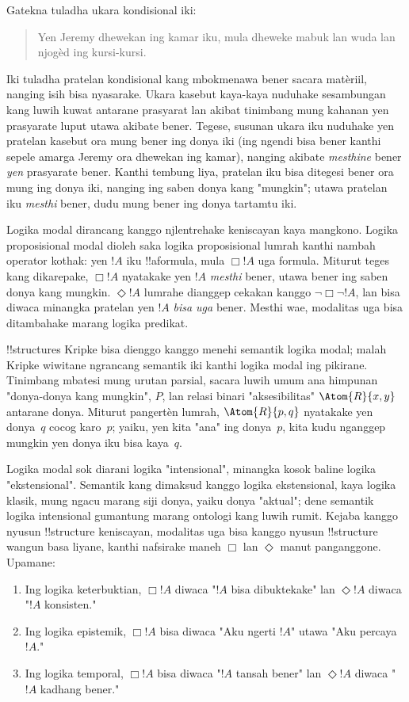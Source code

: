 \documentclass[../../../include/open-logic-section]{subfiles}
\begin{document}


Gatekna tuladha ukara kondisional iki:
\begin{quote}
  Yen Jeremy dhewekan ing kamar iku,
  mula dheweke mabuk lan wuda lan
  njogèd ing kursi-kursi.
\end{quote}
Iki tuladha pratelan kondisional kang
mbokmenawa bener sacara matèriil,
nanging isih bisa nyasarake.
Ukara kasebut kaya-kaya nuduhake
sesambungan kang luwih kuwat
antarane prasyarat lan akibat
tinimbang mung kahanan yen
prasyarate luput utawa akibate
bener. Tegese, susunan ukara
iku nuduhake yen pratelan
kasebut ora mung bener ing
donya iki (ing ngendi bisa
bener kanthi sepele amarga
Jeremy ora dhewekan ing kamar),
nanging akibate \emph{mesthine}
bener \emph{yen} prasyarate
bener. Kanthi tembung liya,
pratelan iku bisa ditegesi
bener ora mung ing donya iki,
nanging ing saben donya kang
"mungkin"; utawa pratelan
iku \emph{mesthi} bener,
dudu mung bener ing donya
tartamtu iki.

Logika modal dirancang kanggo
njlentrehake keniscayan kaya
mangkono. Logika proposisional
modal dioleh saka logika
proposisional lumrah kanthi
nambah operator kothak:
yen $!A$ iku !!a{formula},
mula $\Box !A$ uga
formula. Miturut
teges kang dikarepake,
$\Box !A$ nyatakake
yen $!A$ \emph{mesthi}
bener, utawa bener ing
saben donya kang mungkin.
$\Diamond !A$ lumrahe
dianggep cekakan kanggo
$\lnot \Box \lnot !A$,
lan bisa diwaca minangka
pratelan yen $!A$
\emph{bisa uga} bener.
Mesthi wae, modalitas
uga bisa ditambahake
marang logika predikat.

!!{structure}s Kripke bisa
dienggo kanggo menehi
semantik logika modal;
malah Kripke wiwitane
ngrancang semantik iki
kanthi logika modal
ing pikirane. Tinimbang
mbatesi mung urutan
parsial, sacara luwih
umum ana himpunan
"donya-donya kang mungkin",
$P$, lan relasi binari
"aksesibilitas"
$\Atom{R}{x,y}$
antarane donya.
Miturut pangertèn
lumrah, $\Atom{R}{p,q}$
nyatakake yen donya~$q$
cocog karo~$p$;
yaiku, yen kita "ana"
ing donya~$p$, kita
kudu nganggep mungkin
yen donya iku bisa
kaya~$q$.

Logika modal sok diarani
logika "intensional",
minangka kosok baline
logika "ekstensional".
Semantik kang dimaksud
kanggo logika ekstensional,
kaya logika klasik,
mung ngacu marang siji
donya, yaiku donya
"aktual"; dene semantik
logika intensional
gumantung marang ontologi
kang luwih rumit.
Kejaba kanggo nyusun
!!{structure} keniscayan,
modalitas uga bisa
kanggo nyusun
!!{structure} wangun
basa liyane, kanthi
nafsirake maneh
$\Box$ lan $\Diamond$
manut panganggone.
Upamane:
\begin{enumerate}
\item Ing logika keterbuktian,
  $\Box !A$ diwaca
  "$!A$ bisa dibuktekake"
  lan $\Diamond !A$ diwaca
  "$!A$ konsisten."
\item Ing logika epistemik,
  $\Box !A$ bisa diwaca
  "Aku ngerti $!A$"
  utawa "Aku percaya $!A$."
\item Ing logika temporal,
  $\Box !A$ bisa diwaca
  "$!A$ tansah bener"
  lan $\Diamond !A$ diwaca
  "$!A$ kadhang bener."
\end{enumerate}
\end{document}
